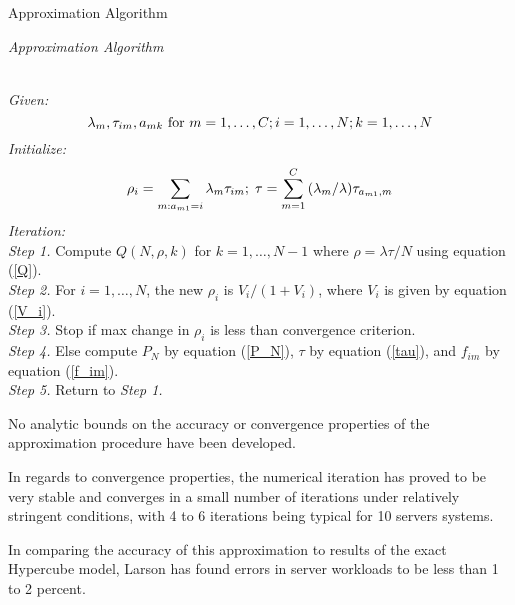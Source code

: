 \begin{frame}{Approximation Algorithm}{}
  {\footnotesize
    \begin{center}
      \textit{ Approximation Algorithm}
    \end{center}
    \vspace{-8pt}
    \hline \\
    \vspace{2pt}
    \textit{Given:}
    \begin{equation*}
      \lambda_m,\tau_{im},a_{mk}\mbox{  for } m = 1,\ldots,C;i=1,\ldots,N;k=1,\ldots,N \hfill
    \end{equation*}
    \textit{Initialize:}
    \begin{equation*}
      \rho_i = \sum_{m: a_{m1} = i}{\lambda_m \tau_{im}}; \; \tau = \sum_{m=1}^{C}{(\lambda_m/\lambda)\tau_{a_{m1},m}} \hfill
    \end{equation*}
    \textit{Iteration:}\\
    \textit{Step 1.} Compute $Q(N,\rho,k)$ for $k = 1,\ldots,N-1$ where $\rho = \lambda \tau / N$ using equation (\ref{Q}). \\
    \textit{Step 2.} For $i = 1,\ldots,N$, the new $\rho_i$ is $V_i/(1+V_i)$, where $V_i$ is given by equation (\ref{V_i}). \\
    \textit{Step 3.} Stop if max change in $\rho_i$ is less than convergence criterion. \\
    \textit{Step 4.} Else compute $P_N$ by equation (\ref{P_N}), $\tau$ by equation (\ref{tau}), and $f_{im}$ by equation (\ref{f_im}). \\
    \textit{Step 5.} Return to \textit{Step 1.} \\
    \hline
  }
\end{frame}

\begin{frame}
  No analytic bounds on the accuracy or convergence properties of the approximation procedure have been developed.

  In regards to convergence properties,
  the numerical iteration has proved to be very stable and converges in a small number of iterations under relatively stringent conditions,
  with 4 to 6 iterations being typical for 10 servers systems.

  In comparing the accuracy of this approximation to results of the exact Hypercube model,
  Larson has found errors in server workloads to be less than 1 to 2 percent.
\end{frame}
